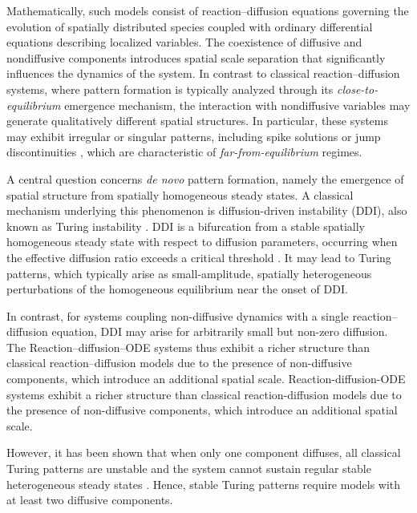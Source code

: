 \documentclass[12pt, a4paper]{amsart}
\numberwithin{equation}{section}
\begin{document}
Mathematically, such models consist of reaction--diffusion equations governing the evolution of spatially distributed species coupled with ordinary differential equations describing localized variables. 
The coexistence of diffusive and nondiffusive components introduces spatial scale separation that significantly influences the dynamics of the system. 
In contrast to classical reaction--diffusion systems, where pattern formation is typically analyzed through its {\it close-to-equilibrium} emergence mechanism, the interaction with nondiffusive variables may generate qualitatively different spatial structures. 
In particular, these systems may exhibit irregular or singular patterns, including spike solutions \cite{HMC14} or jump discontinuities \cite{Cygan2023, Akagi2024, Koethe20, Guo2025}, which are characteristic of {\it far-from-equilibrium} regimes.

A central question concerns \emph{de novo} pattern formation, namely the emergence of spatial structure from spatially homogeneous steady states. A classical mechanism underlying this phenomenon is diffusion-driven instability (DDI), also known as Turing instability \cite{turing1952chemical}.
DDI is a bifurcation from a stable spatially homogeneous steady state with respect to diffusion parameters, occurring when the effective diffusion ratio exceeds a critical threshold \cite{Nishiura1982}. It may lead to Turing patterns, which typically arise as small-amplitude, spatially heterogeneous perturbations of the homogeneous equilibrium near the onset of DDI.
 
In contrast, for systems coupling non-diffusive dynamics with a single reaction–diffusion equation, DDI may arise for arbitrarily small but non-zero diffusion. The  Reaction–diffusion–ODE systems thus exhibit a richer structure than classical reaction–diffusion models due to the presence of non-diffusive components, which introduce an additional spatial scale. Reaction-diffusion-ODE systems exhibit a richer structure than classical reaction-diffusion models due to the presence of non-diffusive components, which introduce an additional spatial scale.  

However, it has been shown that when only one component diffuses, all classical Turing patterns are unstable and the system cannot sustain regular stable heterogeneous steady states \cite{Cygan2022}. 
Hence, stable Turing patterns require models with at least two diffusive components.
\end{document}
